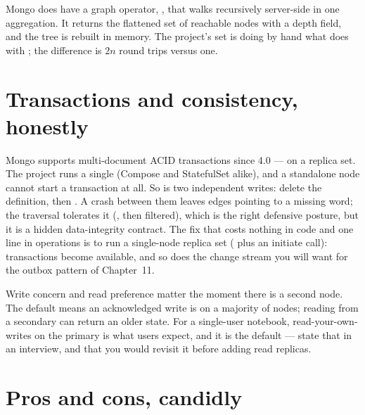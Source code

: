 Mongo does have a graph operator, , that walks
 recursively server-side in one aggregation. It
returns the flattened set of reachable nodes with a depth field, and
the tree is rebuilt in memory. The project's  set is doing
by hand what  does with ; the
difference is $2n$ round trips versus one.

\section{Transactions and consistency, honestly}

Mongo supports multi-document ACID transactions since 4.0 --- on a
replica set. The project runs a single  (Compose and
StatefulSet alike), and a standalone node cannot start a transaction at
all. So  is two independent writes: delete the
definition, then . A crash
between them leaves edges pointing to a missing word; the traversal
tolerates it (, then filtered), which is the right
defensive posture, but it is a hidden data-integrity contract. The
fix that costs nothing in code and one line in operations is to run a
single-node replica set ( plus an initiate call):
transactions become available, and so does the change stream you will
want for the outbox pattern of Chapter~11.

Write concern and read preference matter the moment there is a second
node. The default  means an acknowledged write is on a
majority of nodes; reading from a secondary can return an older state.
For a single-user notebook, read-your-own-writes on the primary is what
users expect, and it is the default --- state that in an interview, and
that you would revisit it before adding read replicas.

\section{Pros and cons, candidly}

